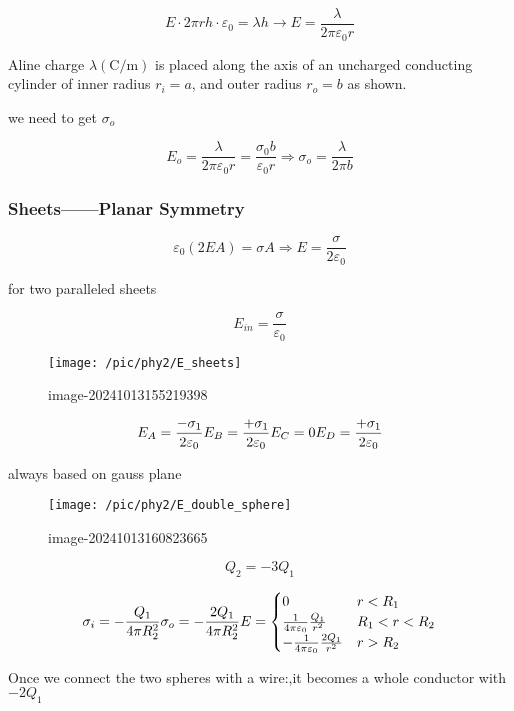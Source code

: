 \documentclass[
]{article}
\begin{document}
\[
E \cdot 2\pi r h\cdot \varepsilon_0=\lambda h\to E=\frac{
\lambda 
}{2\pi \varepsilon _0 r}
\]

Aline charge \(\lambda\left(\text{C/m}\right)\) is placed along the axis
of an uncharged conducting cylinder of inner radius \(r_i=a\), and outer
radius \(r_o=b\) as shown.

we need to get \(\sigma_o\)

\[
E_o=\frac{\lambda }{2\pi \varepsilon _0 r}=\frac{\sigma_0b}{\varepsilon _0 r}\Rightarrow \sigma_o=\frac{\lambda}{2\pi b}
\]

\hypertarget{sheetsplanar-symmetry}{%
\subsubsection{Sheets------Planar
Symmetry}\label{sheetsplanar-symmetry}}

\[
\varepsilon _0(2EA)=\sigma A \Rightarrow E=\frac{\sigma}{2\varepsilon _0}
\]

for two paralleled sheets

\[
E_{in}=\frac{\sigma}{\varepsilon _0}
\]

\begin{figure}
\centering
\texttt{[image: /pic/phy2/E\_sheets]}
\caption{image-20241013155219398}
\end{figure}

\[
E_A=\frac{-\sigma_1}{2\varepsilon _0}\\E_B=\frac{+\sigma_1}{2\varepsilon _0}\\E_C=0\\E_D=\frac{+\sigma_1}{2\varepsilon _0}
\]

always based on gauss plane

\begin{figure}
\centering
\texttt{[image: /pic/phy2/E\_double\_sphere]}
\caption{image-20241013160823665}
\end{figure}

\[
Q_2=-3Q_1
\]

\[
\sigma _i=-\frac{Q_1}{4\pi R_2^2}\\\sigma _o=-\frac{2Q_1}{4\pi R_2^2}\\E=\begin{cases}0&r<R_1\\\frac{1}{4\pi \varepsilon_0 }\frac{Q_1}{r^2} &R_1<r<R_2\\-\frac{1}{4\pi \varepsilon _0 }\frac{2Q_1}{r^2}&r>R_2\end{cases}
\]

Once we connect the two spheres with a wire:,it becomes a whole
conductor with \(-2Q_1\)
\end{document}
